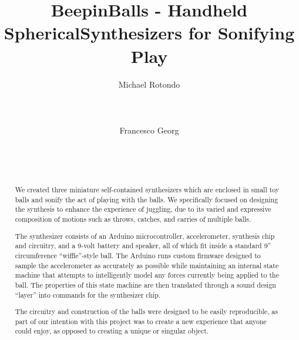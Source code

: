 \documentclass{nime-alternate}
\begin{document}
%

\title{BeepinBalls - Handheld Spherical\linebreak Synthesizers for Sonifying Play}

\author{
\alignauthor
Michael Rotondo\\
       \\
       \\
       \\
\alignauthor
Francesco Georg\\
       \\
       \\
       \\
}
\maketitle
\begin{abstract}
We created three miniature self-contained synthesizers which are enclosed in small toy balls and sonify the act of playing with the balls. We specifically focused on designing the synthesis to enhance the experience of juggling, due to its varied and expressive composition of motions such as throws, catches, and carries of multiple balls. 

The synthesizer consists of an Arduino microcontroller, accelerometer, synthesis chip and circuitry, and a 9-volt battery and speaker, all of which fit inside a standard 9'' circumference ``wiffle''-style ball. The Arduino runs custom firmware designed to sample the accelerometer as accurately as possible while maintaining an internal state machine that attempts to intelligently model any forces currently being applied to the ball. The properties of this state machine are then translated through a sound design ``layer'' into commands for the synthesizer chip.

The circuitry and construction of the  balls were designed to be easily reproducible, as part of our intention with this project was to create a new experience that anyone could enjoy, as opposed to creating a unique or singular object.
\end{abstract}
\end{document}
